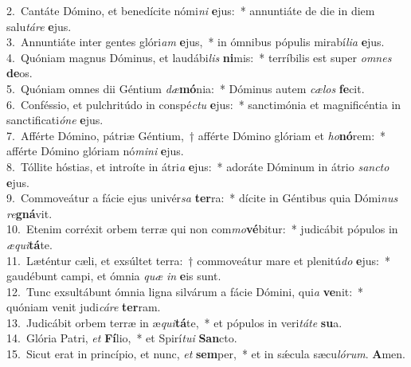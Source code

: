 {2.~}Cantáte Dómino, et benedícite nómi\textit{ni} \textbf{e}jus:~* annuntiáte de die in diem salu\textit{tá}\textit{re} \textbf{e}jus.\\
{3.~}Annuntiáte inter gentes glóri\textit{am} \textbf{e}jus,~* in ómnibus pópulis mirabí\textit{li}\textit{a} \textbf{e}jus.\\
{4.~}Quóniam magnus Dóminus, et laudábi\textit{lis} \textbf{ni}mis:~* terríbilis est super \textit{om}\textit{nes} \textbf{de}os.\\
{5.~}Quóniam omnes dii Géntium \textit{dæ}\textbf{mó}nia:~* Dóminus autem \textit{cæ}\textit{los} \textbf{fe}cit.\\
{6.~}Conféssio, et pulchritúdo in conspé\textit{ctu} \textbf{e}jus:~* sanctimónia et magnificéntia in sanctificati\textit{ó}\textit{ne} \textbf{e}jus.\\
{7.~}Afférte Dómino, pátriæ Géntium,~† afférte Dómino glóriam et \textit{ho}\textbf{nó}rem:~* afférte Dómino glóriam nó\textit{mi}\textit{ni} \textbf{e}jus.\\
{8.~}Tóllite hóstias, et introíte in átri\textit{a} \textbf{e}jus:~* adoráte Dóminum in átrio \textit{san}\textit{cto} \textbf{e}jus.\\
{9.~}Commoveátur a fácie ejus univér\textit{sa} \textbf{ter}ra:~* dícite in Géntibus quia Dómi\textit{nus} \textit{re}\textbf{gná}vit.\\
{10.~}Etenim corréxit orbem terræ qui non com\textit{mo}\textbf{vé}bitur:~* judicábit pópulos in \textit{æ}\textit{qui}\textbf{tá}te.\\
{11.~}Læténtur cæli, et exsúltet terra:~† commoveátur mare et plenitú\textit{do} \textbf{e}jus:~* gaudébunt campi, et ómnia \textit{quæ} \textit{in} \textbf{e}is sunt.\\
{12.~}Tunc exsultábunt ómnia ligna silvárum a fácie Dómini, qui\textit{a} \textbf{ve}nit:~* quóniam venit judi\textit{cá}\textit{re} \textbf{ter}ram.\\
{13.~}Judicábit orbem terræ in æ\textit{qui}\textbf{tá}te,~* et pópulos in veri\textit{tá}\textit{te} \textbf{su}a.\\
{14.~}Glória Patri, \textit{et} \textbf{Fí}lio,~* et Spirí\textit{tu}\textit{i} \textbf{San}cto.\\
{15.~}Sicut erat in princípio, et nunc, \textit{et} \textbf{sem}per,~* et in sǽcula sæcu\textit{ló}\textit{rum}. \textbf{A}men.\\

